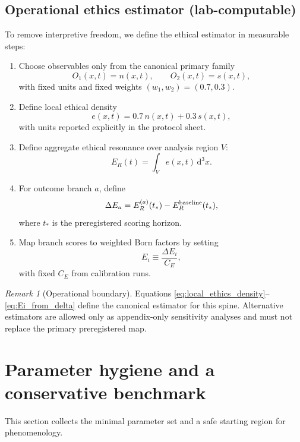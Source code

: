 \documentclass[reprint,amsmath,amssymb,aps,showkeys]{revtex4-2}
\theoremstyle{remark}
\newtheorem{remark}{Remark}
\newcommand{\dd}{\mathrm{d}}
\begin{document}
\subsection{Operational ethics estimator (lab-computable)}
To remove interpretive freedom, we define the ethical estimator in measurable steps:
\begin{enumerate}[leftmargin=*,label=(\alph*)]
\item Choose observables only from the canonical primary family
\[
O_1(x,t)=n(x,t), \qquad O_2(x,t)=s(x,t),
\]
with fixed units and fixed weights $(w_1,w_2)=(0.7,0.3)$.
\item Define local ethical density
\begin{equation}
e(x,t)=0.7\,n(x,t)+0.3\,s(x,t),
\label{eq:local_ethics_density}
\end{equation}
with units reported explicitly in the protocol sheet.
\item Define aggregate ethical resonance over analysis region $V$:
\begin{equation}
E_R(t)=\int_V e(x,t)\,\dd^3x.
\label{eq:ER}
\end{equation}
\item For outcome branch $a$, define
\begin{equation}
\Delta E_a = E_R^{(a)}(t_*)-E_R^{\rm baseline}(t_*),
\label{eq:deltaEa}
\end{equation}
where $t_*$ is the preregistered scoring horizon.
\item Map branch scores to weighted Born factors by setting
\begin{equation}
E_i \equiv \frac{\Delta E_i}{C_E},
\label{eq:Ei_from_delta}
\end{equation}
with fixed $C_E$ from calibration runs.
\end{enumerate}

\begin{remark}[Operational boundary]
Equations \eqref{eq:local_ethics_density}--\eqref{eq:Ei_from_delta} define the canonical estimator for this spine.
Alternative estimators are allowed only as appendix-only sensitivity analyses and must not replace the primary preregistered map.
\end{remark}

\section{Parameter hygiene and a conservative benchmark}
This section collects the minimal parameter set and a safe starting region for phenomenology.
\end{document}
